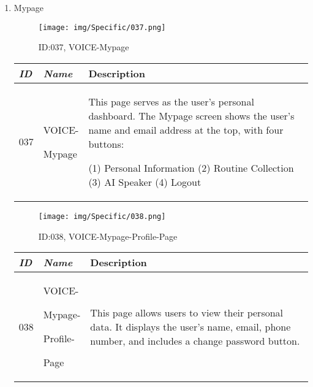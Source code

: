 \documentclass[conference]{IEEEtran}
\begin{document}
\begin{enumerate}[label=\arabic*]
    \vspace{2em}
    
    \item Mypage\par
    \vspace{0.3em}

    \begin{figure}[h]
        \centering
        \texttt{[image: img/Specific/037.png]}
        \caption{ID:037, VOICE-Mypage}
    \end{figure}

    \begin{table}[h]
    \def\arraystretch{1.2} \small
        \begin{tabular}{|p{1cm}|p{1.8cm}|p{4.8cm}|}
        \hline
            \textit{\textbf{ID}} & \textit{\textbf{Name}} & {\textbf{Description}} \\
        \hline
            037 \par & VOICE-\par Mypage & This page serves as the user's personal dashboard. The Mypage screen shows the user's name and email address at the top, with four buttons:\par (1) Personal Information (2) Routine Collection (3) AI Speaker (4) Logout \\
        \hline
        \end{tabular}
    \end{table}

    \newpage

    \begin{figure}[h]
        \centering
        \texttt{[image: img/Specific/038.png]}
        \caption{ID:038, VOICE-Mypage-Profile-Page}
    \end{figure}

    \begin{table}[h]
    \def\arraystretch{1.2} \small
        \begin{tabular}{|p{1cm}|p{1.8cm}|p{4.8cm}|}
        \hline
            \textit{\textbf{ID}} & \textit{\textbf{Name}} & {\textbf{Description}} \\
        \hline
            038 \par & VOICE-\par Mypage-\par Profile-\par Page & This page allows users to view their personal data. It displays the user's name, email, phone number, and includes a change password button. \\
        \hline
        \end{tabular}
    \end{table}


\end{enumerate}
\end{document}
